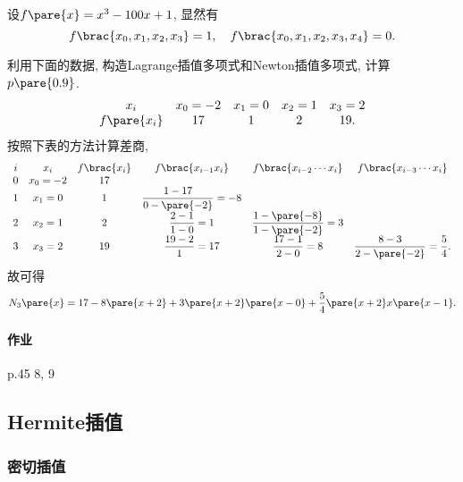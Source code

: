 \documentclass[hidelinks]{ctexart}
\begin{document}
\begin{ex}
    设$f\pare{x} = x^3 - 100 x + 1$, 显然有
    \[ f\brac{x_0,x_1,x_2,x_3} = 1,\quad f\brac{x_0,x_1,x_2,x_3,x_4} = 0. \]
\end{ex}
\begin{ex}
    利用下面的数据, 构造Lagrange插值多项式和Newton插值多项式, 计算$p\pare{0.9}$.
    \[ \begin{array}{ccccc}
        x_i & x_0 = -2 & x_1 = 0 & x_2 = 1 & x_3 = 2 \\
        f\pare{x_i} & 17 & 1 & 2 & 19.
    \end{array} \]
    按照下表的方法计算差商,
    \[ \begin{array}{cccccc}
        i & x_i & f\brac{x_i} & f\brac{x_{i-1}x_i} & f\brac{x_{i-2}\cdots x_i} & f\brac{x_{i-3}\cdots x_i} \\
        0 & x_0 = -2 & 17 \\
        1 & x_1 = 0 & 1 & \displaystyle \frac{1-17}{0-\pare{-2}} = -8 \\[.5em]
        2 & x_2 = 1 & 2 & \displaystyle \frac{2-1}{1-0} = 1 & \displaystyle \frac{1-\pare{-8}}{1-\pare{-2}} = 3 \\[.5em]
        3 & x_3 = 2 & 19 & \displaystyle \frac{19-2}{1} = 17 & \displaystyle \frac{17 - 1}{2 - 0} = 8 & \displaystyle \frac{8 - 3}{2-\pare{-2}} = \frac{5}{4}.
    \end{array} \]
    故可得
    \[ N_3\pare{x} = 17 - 8\pare{x+2} + 3\pare{x+2}\pare{x-0} + \frac{5}{4}\pare{x+2}x\pare{x-1}. \]
\end{ex}

\paragraph{作业} %
\label{par:作业}

p.45 8, 9




\subsection{Hermite插值} %
\label{sub:hermite插值}

\subsubsection{密切插值} %
\label{ssub:密切插值}
\end{document}
